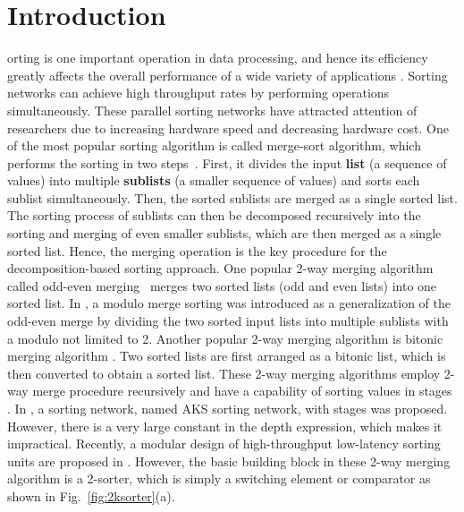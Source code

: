 \documentclass[10pt,journal,cspaper,compsoc]{IEEEtran}
\begin{document}
\section{Introduction}
orting is one important operation in data processing, and hence its efficiency greatly affects the overall performance of a wide variety of applications \cite{knuth1973art,Bat68sorting}.
Sorting networks can achieve high throughput rates by performing operations simultaneously.
These parallel sorting networks have attracted attention of researchers due to increasing hardware speed and decreasing hardware cost. One of the most popular sorting algorithm is called merge-sort algorithm, which performs the sorting in two steps~\cite{Bat68sorting}. First, it divides the input \textbf{list} (a sequence of values) into multiple \textbf{sublists} (a smaller sequence of values) and sorts each sublist simultaneously. Then, the sorted sublists are merged as a single sorted list. The sorting process of sublists can then be decomposed recursively into the sorting and merging of even smaller sublists, which are then merged as a single sorted list. Hence, the merging operation is the key procedure for the decomposition-based sorting approach.
One popular 2-way merging algorithm called odd-even merging~\cite{Bat68sorting} merges two sorted lists (odd and even lists) into one sorted list. In \cite{liszka1992modulo}, a modulo merge sorting was introduced as a generalization of the odd-even merge by dividing the two sorted input lists into multiple sublists with a modulo not limited to 2. Another popular 2-way merging algorithm is bitonic merging algorithm \cite{batcher1990bitonic}. Two sorted lists are first arranged as a bitonic list, which is then converted to obtain a sorted list.
These 2-way merging algorithms employ 2-way merge procedure recursively and have a capability of sorting  values in  stages \cite{Bat68sorting}.
In \cite{ajtai19830}, a sorting network, named AKS sorting network, with  stages was proposed. However, there is a very large constant in the depth expression, which makes it impractical. Recently, a modular design of high-throughput low-latency sorting units are proposed in \cite{farmahini2013modular}.
However, the basic building block in these 2-way merging algorithm is a 2-sorter, which is simply a  switching element or comparator as shown in Fig.~\ref{fig:2ksorter}(a).
\end{document}
